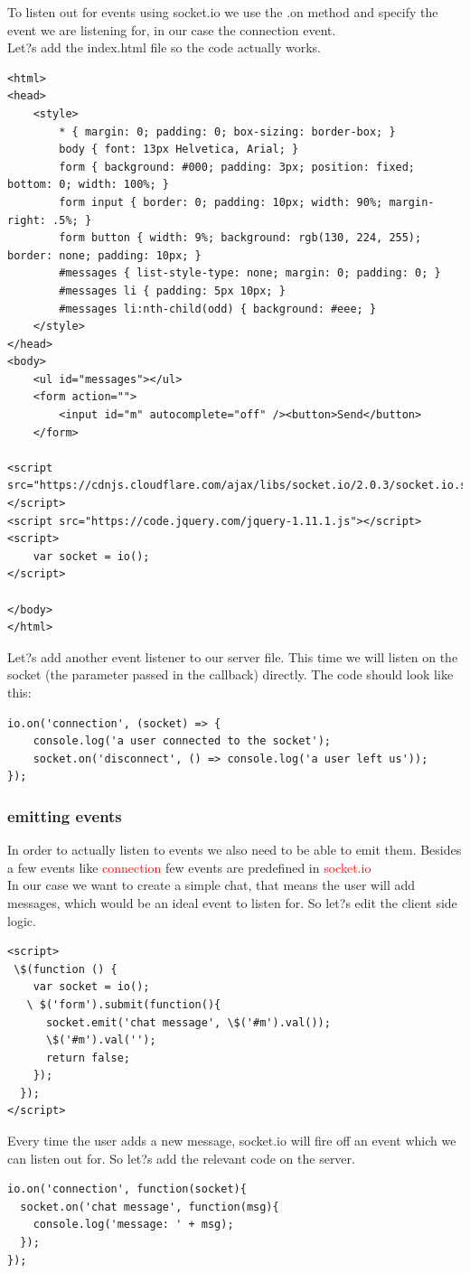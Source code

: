 \documentclass[a4paper]{article}
\begin{document}
To listen out for events using socket.io we use the .on method and specify the event we are listening for, in our case the connection event.\\

Let?s add the index.html file so the code actually works.
\begin{lstlisting}
<html>
<head>
    <style>
        * { margin: 0; padding: 0; box-sizing: border-box; }
        body { font: 13px Helvetica, Arial; }
        form { background: #000; padding: 3px; position: fixed; bottom: 0; width: 100%; }
        form input { border: 0; padding: 10px; width: 90%; margin-right: .5%; }
        form button { width: 9%; background: rgb(130, 224, 255); border: none; padding: 10px; }
        #messages { list-style-type: none; margin: 0; padding: 0; }
        #messages li { padding: 5px 10px; }
        #messages li:nth-child(odd) { background: #eee; }
    </style>
</head>
<body>
    <ul id="messages"></ul>
    <form action="">
        <input id="m" autocomplete="off" /><button>Send</button>
    </form>

<script src="https://cdnjs.cloudflare.com/ajax/libs/socket.io/2.0.3/socket.io.slim.js"></script>
<script src="https://code.jquery.com/jquery-1.11.1.js"></script>
<script>
    var socket = io();
</script>

</body>
</html>
\end{lstlisting}
Let?s add another event listener to our server file. This time we will listen on the socket (the parameter passed in the callback) directly. The code should look like this:
\begin{lstlisting}
io.on('connection', (socket) => {
    console.log('a user connected to the socket');
    socket.on('disconnect', () => console.log('a user left us'));
});
\end{lstlisting}
\subsubsection{emitting events}
In order to actually listen to events we also need to be able to emit them. Besides a few events like \textcolor{red}{connection} few events are predefined in \textcolor{red}{socket.io}\\

In our case we want to create a simple chat, that means the user will add messages, which would be an ideal event to listen for. So let?s edit the client side logic.
\begin{lstlisting}
<script>
 \$(function () {
    var socket = io();
   \ $('form').submit(function(){
      socket.emit('chat message', \$('#m').val());
      \$('#m').val('');
      return false;
    });
  });
</script>
\end{lstlisting}
Every time the user adds a new message, socket.io will fire off an event which we can listen out for. So let?s add the relevant code on the server.
\begin{lstlisting}
io.on('connection', function(socket){
  socket.on('chat message', function(msg){
    console.log('message: ' + msg);
  });
});

\end{lstlisting}
\end{document}
